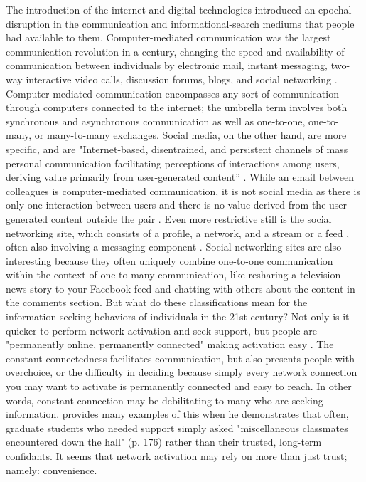 The introduction of the internet and digital technologies introduced an epochal
disruption in the communication and informational-search mediums that people had
available to them. Computer-mediated communication was the largest communication
revolution in a century, changing the speed and availability of communication
between individuals by electronic mail, instant messaging, two-way interactive
video calls, discussion forums, blogs, and social networking
\citep{rainie2012networked}. Computer-mediated communication encompasses any
sort of communication through computers connected to the internet; the umbrella
term involves both synchronous and asynchronous communication as well as
one-to-one, one-to-many, or many-to-many exchanges. Social media, on the other
hand, are more specific, and are "Internet-based, disentrained, and persistent
channels of mass personal communication facilitating perceptions of interactions
among users, deriving value primarily from user-generated content” \citep[][p.
50]{carr2015social}. While an email between colleagues is computer-mediated
communication, it is not social media as there is only one interaction between
users and there is no value derived from the user-generated content outside the
pair \citep{bayer_etal20}. Even more restrictive still is the social networking
site, which consists of a profile, a network, and a stream or a feed
\citep{boyd2007social, ellison2013sociality},  often also involving a messaging
component  \citep{bayer_etal20}. Social networking sites are also interesting
because they often uniquely combine one-to-one communication within the context
of one-to-many communication, like resharing a television news story to your
Facebook feed and chatting with others about the content in the comments
section. But what do these classifications mean for the information-seeking
behaviors of individuals in the 21st century? Not only is it quicker to perform
network activation and seek support, but people are "permanently online,
permanently connected" making activation easy \citep{vorderer2017permanently}.
The constant connectedness facilitates communication, but also presents people
with overchoice, or the difficulty in deciding because simply every network
connection you may want to activate is permanently connected and easy to reach.
In other words, constant connection may be debilitating to many who are seeking
information. \citet{smallSomeoneTalk2017} provides many examples of this when he
demonstrates that often, graduate students who needed support simply asked
"miscellaneous classmates encountered down the hall" (p. 176) rather than their
trusted, long-term confidants. It seems that network activation may rely on more
than just trust; namely: convenience.

